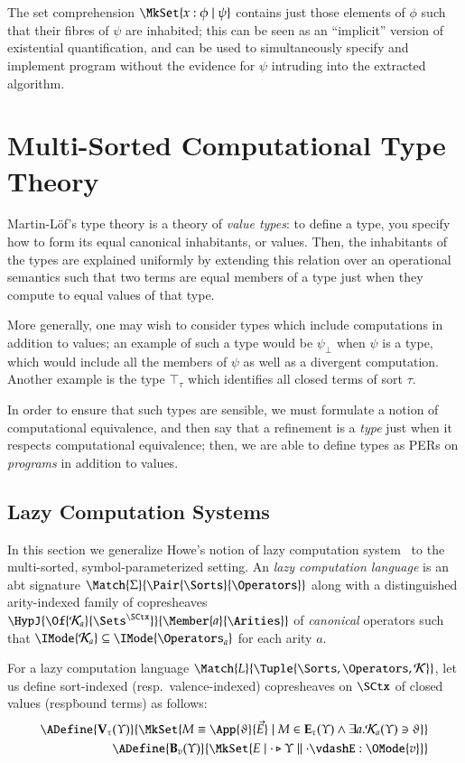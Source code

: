 \documentclass[11pt]{article}
\theoremstyle{definition}
\theoremstyle{notation}
\theoremstyle{remark}
\numberwithin{equation}{section}
\newcommand\IsSubsetEq[2]{\IMode{#1}\subseteq\IMode{#2}}
\newcommand\IsAbtUnmoded[5]{
  #1\triangleright%
  #2\parallel%
  #3\vdash%
  #4:\OMode{#5}%
}
\newcommand\TyTop[1]{\top_{#1}}
\newcommand\Exprs{\mathbf{E}}
\newcommand\Values{\mathbf{V}}
\newcommand\BTms{\mathbf{B}}
\begin{document}
The set comprehension $\MkSet{x:\phi\mid\psi}$ contains just those elements of
$\phi$ such that their fibres of $\psi$ are inhabited; this can be seen as an
``implicit'' version of existential quantification, and can be used to
simultaneously specify and implement program without the evidence for $\psi$
intruding into the extracted algorithm.

\section{Multi-Sorted Computational Type Theory}
\label{sec:ctt}

Martin-L\"of's type theory is a theory of \emph{value types}: to define a type,
you specify how to form its equal canonical inhabitants, or values. Then, the
inhabitants of the types are explained uniformly by extending this relation
over an operational semantics such that two terms are equal members of a
type just when they compute to equal values of that type.

More generally, one may wish to consider types which include computations in
addition to values; an example of such a type would be $\psi_\bot$ when $\psi$
is a type, which would include all the members of $\psi$ as well as a divergent
computation. Another example is the type $\TyTop{\tau}$ which identifies all
closed terms of sort $\tau$.

In order to ensure that such types are sensible, we must formulate a notion of
computational equivalence, and then say that a refinement is a \emph{type} just
when it respects computational equivalence; then, we are able to define types
as PERs on \emph{programs} in addition to values.


\subsection{Lazy Computation Systems}

In this section we generalize Howe's notion of lazy computation
system~\cite{howe:1989} to the multi-sorted, symbol-parameterized setting. An
\emph{lazy computation language} is an abt signature
$\Match{\Sigma}{\Pair{\Sorts}{\Operators}}$ along with a distinguished
arity-indexed family of copresheaves
$\HypJ{\Of{\CanOperators_a}{\Sets^\SCtx}}{\Member{a}{\Arities}}$ of
\emph{canonical} operators such that
$\IsSubsetEq{\CanOperators_a}{\Operators_a}$ for each arity $a$.

For a lazy computation language
$\Match{L}{\Tuple{\Sorts,\Operators,\CanOperators}}$, let us define
sort-indexed (resp.\ valence-indexed) copresheaves on $\SCtx$ of closed values
(resp\. bound terms) as follows:
\begin{align*}
  \ADefine{\Values_\tau(\Upsilon)}{
    \MkSet{
      M\equiv\App{\vartheta}{\vec{E}}
      \mid M\in\Exprs_\tau(\Upsilon)\land \exists a. \CanOperators_a(\Upsilon)\ni\vartheta
    }
  }\\
  \ADefine{
    \BTms_{v}(\Upsilon)
  }{
    \MkSet{E \mid \IsAbtUnmoded{\cdot}{\Upsilon}{\cdot}{E}{v}}
  }
\end{align*}
\end{document}
